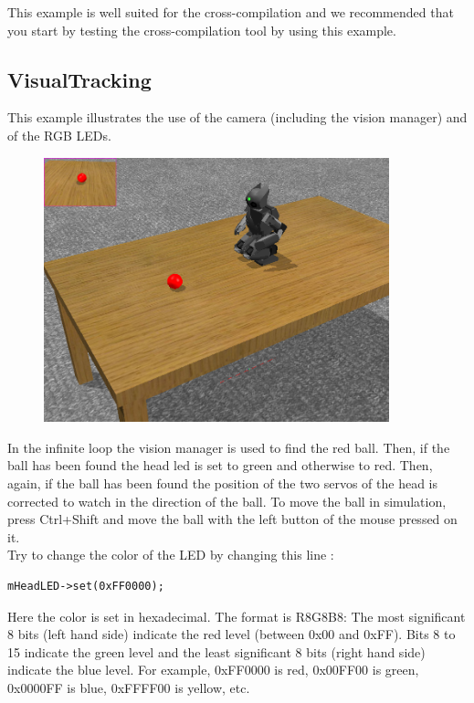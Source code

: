 \documentclass[a4paper, 12pt]{article}  		%
\begin{document}
This example is well suited for the cross-compilation and we recommended that you start by testing the cross-compilation tool by using this example.\\

\newpage
\subsection{VisualTracking}

This example illustrates the use of the camera (including the vision manager) and of the RGB LEDs.\\

\begin{figure}[H]
\begin{center}
\includegraphics[width=10cm]{example_visualTracking.png}
\label{example_visualTracking.png}
\end{center}
\end{figure}

In the infinite loop the vision manager is used to find the red ball. 
Then, if the ball has been found the head led is set to green and otherwise to red.
Then, again, if the ball has been found the position of the two servos of the head is corrected to watch in the direction of the ball. To move the ball in simulation, press Ctrl+Shift and move the ball with the left button of the mouse pressed on it.\\

Try to change the color of the LED by changing this line :
\lstset{language=c++} 
\lstset{commentstyle=\textit} 
\begin{lstlisting} 
mHeadLED->set(0xFF0000);
\end{lstlisting}
Here the color is set in hexadecimal. The format is R8G8B8: The most significant 8 bits (left hand side) indicate the red level (between 0x00 and 0xFF). Bits 8 to 15 indicate the green level and the least significant 8 bits (right hand side) indicate the blue level. For example, 0xFF0000 is red, 0x00FF00 is green, 0x0000FF is blue, 0xFFFF00 is yellow, etc.\\
\end{document}
